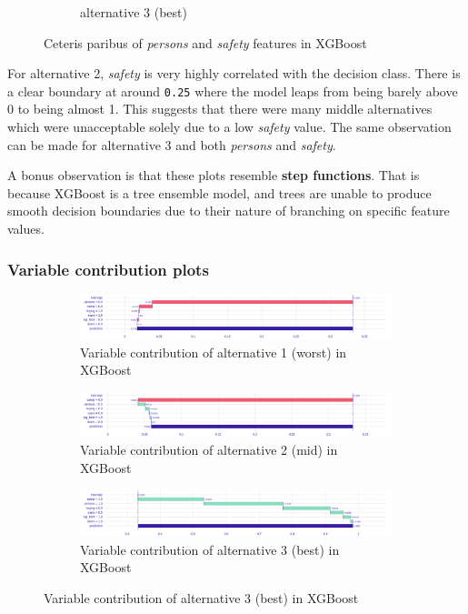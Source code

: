 \documentclass[../main.tex]{subfiles}
\begin{document}
\begin{figure}[H]
\begin{subfigure}[b]{0.32\linewidth}
		\caption{alternative 3 (best)}
		\label{fig:xgb-3alt1-cetpar}
	\end{subfigure}
	\caption{Ceteris paribus of \emph{persons} and \emph{safety} features in XGBoost}
	\label{fig:xgb-3alt-allcetpar}
\end{figure}
For alternative 2, \emph{safety} is very highly correlated with the decision
class. There is a clear boundary at around \verb`0.25` where the model leaps
from being barely above 0 to being almost 1. This suggests that there were many
middle alternatives which were unacceptable solely due to a low \emph{safety}
value. The same observation can be made for alternative 3 and both
\emph{persons} and \emph{safety}.

A bonus observation is that these plots resemble \textbf{step functions}. That
is because XGBoost is a tree ensemble model, and trees are unable to produce
smooth decision boundaries due to their nature of branching on specific feature
values.

\subsubsection{Variable contribution plots}
\begin{figure}[H]
	\centering
	\begin{subfigure}{\linewidth}
		\includegraphics[width=\linewidth]{../img/xgb-breakdown-worst.png}
		\caption{Variable contribution of alternative 1 (worst) in XGBoost}
		\label{fig:xgb-3alt1-contrib}
	\end{subfigure}
	\begin{subfigure}{\linewidth}
		\includegraphics[width=\linewidth]{../img/xgb-breakdown-mid.png}
		\caption{Variable contribution of alternative 2 (mid) in XGBoost}
		\label{fig:xgb-3alt2-contrib}
	\end{subfigure}
	\begin{subfigure}{\linewidth}
		\includegraphics[width=\linewidth]{../img/xgb-breakdown-best.png}
		\caption{Variable contribution of alternative 3 (best) in XGBoost}
		\label{fig:xgb-3alt3-contrib}
	\end{subfigure}
\end{figure}
\end{document}

